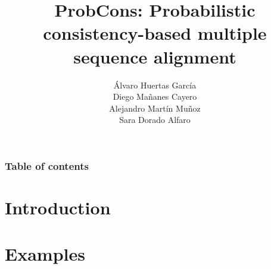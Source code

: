 \documentclass[11pt]{beamer}
\title[ProbCons]{ProbCons: Probabilistic consistency-based multiple sequence alignment}
\author[Group 5]{Álvaro Huertas García \\ Diego Mañanes Cayero
                 \\ Alejandro Martín Muñoz \\ Sara Dorado Alfaro}
\begin{document}
\frame{\titlepage}
\begin{frame}
    \frametitle{Table of contents}
    \tableofcontents
\end{frame}


\section{Introduction} 


\section{Examples} 


\frame{\titlepage}
\end{document}
